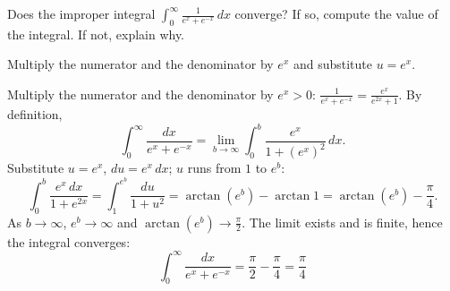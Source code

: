 
\begin{question}
Does the improper integral $\displaystyle\int_0^\infty\frac{1}{e^x+e^{-x}}\,dx$ converge? If so, compute the value of the integral. If not, explain why.
\end{question}

\begin{hint}
Multiply the numerator and the denominator by $e^x$ and substitute $u=e^x$.
\end{hint}

\begin{solution}
Multiply the numerator and the denominator by $e^x>0$: $\frac{1}{e^x+e^{-x}}=\frac{e^x}{e^{2x}+1}$. By definition,
\[ \int_0^\infty\frac{dx}{e^x+e^{-x}}=\lim_{b\to\infty}\int_0^b\frac{e^x}{1+(e^x)^2}\,dx. \]
Substitute $u=e^x$, $du=e^x\,dx$; $u$ runs from $1$ to $e^b$:
\[ \int_0^b\frac{e^x\,dx}{1+e^{2x}}=\int_1^{e^b}\frac{du}{1+u^2}=\arctan(e^b)-\arctan1=\arctan(e^b)-\frac\pi4. \]
As $b\to\infty$, $e^b\to\infty$ and $\arctan(e^b)\to\frac\pi2$. The limit exists and is finite, hence the integral converges:
\[ \boxed{\int_0^\infty\frac{dx}{e^x+e^{-x}}=\frac\pi2-\frac\pi4=\frac\pi4} \]
\end{solution}
